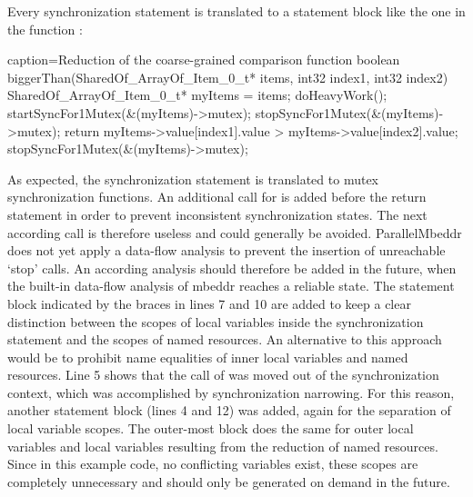 Every synchronization statement is translated to a statement block like the one in the function :
\begin{ccode}{caption=Reduction of the coarse-grained comparison function}
boolean biggerThan(SharedOf_ArrayOf_Item_0_t* items, int32 index1, int32 index2) {
  { 
    SharedOf_ArrayOf_Item_0_t* myItems = items; 
    { 
      doHeavyWork(); 
      startSyncFor1Mutex(&(myItems)->mutex); 
      { 
        stopSyncFor1Mutex(&(myItems)->mutex); 
        return myItems->value[index1].value > myItems->value[index2].value; 
      } 
      stopSyncFor1Mutex(&(myItems)->mutex); 
    } 
  }
}
\end{ccode}
As expected, the synchronization statement is translated to mutex synchronization functions. An additional call for  is added before the return statement in order to prevent inconsistent synchronization states. The next according call is therefore useless and could generally be avoided. ParallelMbeddr does not yet apply a data-flow analysis to prevent the insertion of unreachable `stop' calls. An according analysis should therefore be added in the future, when the built-in data-flow analysis of mbeddr reaches a reliable state. The statement block indicated by the braces in lines 7 and 10 are added to keep a clear distinction between the scopes of local variables inside the synchronization statement and the scopes of named resources. An alternative to this approach would be to prohibit name equalities of inner local variables and named resources. Line 5 shows that the call of  was moved out of the synchronization context, which was accomplished by synchronization narrowing. For this reason, another statement block (lines 4 and 12) was added, again for the separation of local variable scopes. The outer-most block does the same for outer local variables and local variables resulting from the reduction of named resources. Since in this example code, no conflicting variables exist, these scopes are completely unnecessary and should only be generated on demand in the future.

